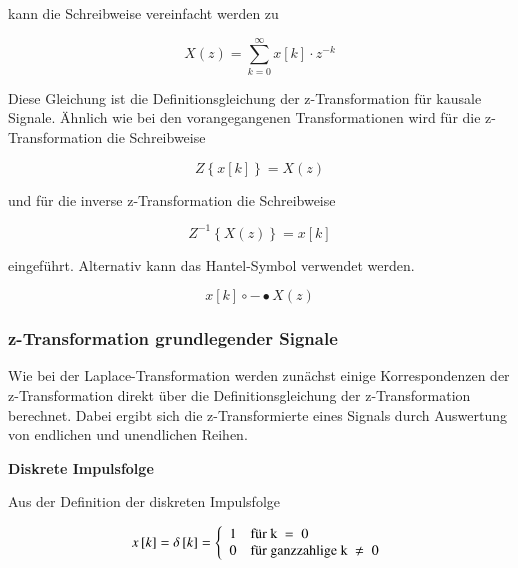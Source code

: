 \noindent kann die Schreibweise vereinfacht werden zu

\begin{equation}\label{eq:fivefive}
X\left(z\right)=\sum _{k=0}^{\infty }x\left[k\right]\cdot z^{-k}  
\end{equation}

\noindent Diese Gleichung ist die Definitionsgleichung der z-Transformation f\"{u}r kausale Signale. \"{A}hnlich wie bei den vorangegangenen Transformationen wird f\"{u}r die z-Transformation die Schreibweise 

\begin{equation}\label{eq:fivesix}
Z\left\{x\left[k\right]\right\}=X\left(z\right)
\end{equation}

\noindent und f\"{u}r die inverse z-Transformation die Schreibweise

\begin{equation}\label{eq:fiveseven}
Z^{-1} \left\{X\left(z\right)\right\}=x\left[k\right]
\end{equation}

\noindent eingef\"{u}hrt. Alternativ kann das Hantel-Symbol verwendet werden.

\begin{equation}\label{eq:fiveeight}
x\left[k\right]\circ -\bullet X\left(z\right)
\end{equation}

\subsubsection{z-Transformation grundlegender Signale}

\noindent Wie bei der Laplace-Transformation werden zun\"{a}chst einige Korrespondenzen der z-Transformation direkt \"{u}ber die Definitionsgleichung der z-Transformation berechnet. Dabei ergibt sich die z-Transformierte eines Signals durch Auswertung von endlichen und unendlichen Reihen.\bigskip

{\selectfont
\noindent\textbf{Diskrete Impulsfolge}}\smallskip

\noindent Aus der Definition der diskreten Impulsfolge 

\begin{equation}\label{eq:fivenine}
x\left[k\right]=\delta \left[k\right]=\left\{\begin{array}{l} {1 \quad \text{für k } = {\rm \; 0}} \\ 
{{\rm 0}\quad \text{für ganzzahlige k }\ne {\rm \; 0}} \end{array}\right.
\end{equation}

